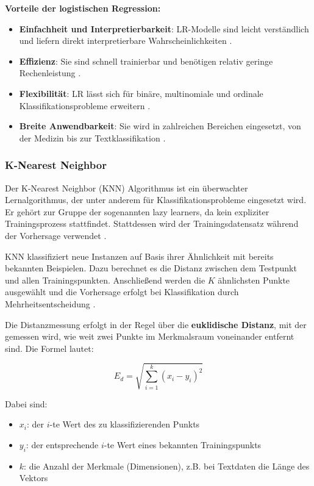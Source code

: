 \textbf{Vorteile der logistischen Regression:}
\begin{itemize}
  \item \textbf{Einfachheit und Interpretierbarkeit}: LR-Modelle sind leicht verständlich und liefern direkt interpretierbare Wahrscheinlichkeiten \cite{aslam2022}.
  \item \textbf{Effizienz}: Sie sind schnell trainierbar und benötigen relativ geringe Rechenleistung \cite{SUDHAKAR2024101028}.
  \item \textbf{Flexibilität}: LR lässt sich für binäre, multinomiale und ordinale Klassifikationsprobleme erweitern \cite{SUDHAKAR2024101028}.
  \item \textbf{Breite Anwendbarkeit}: Sie wird in zahlreichen Bereichen eingesetzt, von der Medizin bis zur Textklassifikation \cite{aslam2022, elchami2025}.
\end{itemize}

\subsubsection{K-Nearest Neighbor}

Der K-Nearest Neighbor (KNN) Algorithmus ist ein überwachter Lernalgorithmus, der unter anderem für Klassifikationsprobleme eingesetzt wird. 
Er gehört zur Gruppe der sogenannten lazy learners, da kein expliziter Trainingsprozess stattfindet. 
Stattdessen wird der Trainingsdatensatz während der Vorhersage verwendet \cite{Verma:2024aa}.

KNN klassifiziert neue Instanzen auf Basis ihrer Ähnlichkeit mit bereits bekannten Beispielen. 
Dazu berechnet es die Distanz zwischen dem Testpunkt und allen Trainingspunkten. 
Anschließend werden die \( K \) ähnlichsten Punkte ausgewählt und die Vorhersage erfolgt bei Klassifikation durch 
Mehrheitsentscheidung \cite{aslam2022}.

Die Distanzmessung erfolgt in der Regel über die \textbf{euklidische Distanz}, mit der gemessen wird, 
wie weit zwei Punkte im Merkmalsraum voneinander entfernt sind. Die Formel lautet:

\begin{equation}
    E_d = \sqrt{ \sum_{i=1}^{k} (x_i - y_i)^2 }
\end{equation}

Dabei sind:
\begin{itemize}
    \item \( x_i \): der \( i \)-te Wert des zu klassifizierenden Punkts
    \item \( y_i \): der entsprechende \( i \)-te Wert eines bekannten Trainingspunkts
    \item \( k \): die Anzahl der Merkmale (Dimensionen), z.B. bei Textdaten die Länge des Vektors
\end{itemize}

